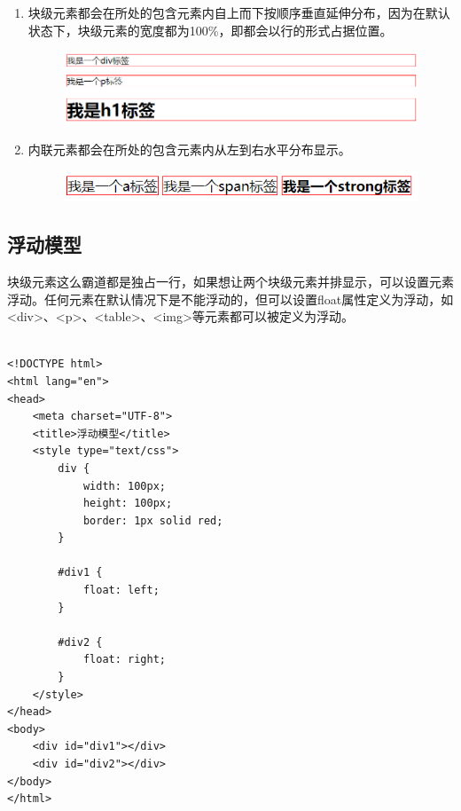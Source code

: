 \begin{enumerate}
	\item 块级元素都会在所处的包含元素内自上而下按顺序垂直延伸分布，因为在默认状态下，块级元素的宽度都为100\%，即都会以行的形式占据位置。
	      \begin{figure}[H]
		      \centering
		      \includegraphics[scale=0.7]{img/C8/8-3/1.png}
	      \end{figure}

	\item 内联元素都会在所处的包含元素内从左到右水平分布显示。
	      \begin{figure}[H]
		      \centering
		      \includegraphics[]{img/C8/8-3/2.png}
	      \end{figure}
\end{enumerate}

\subsection{浮动模型}

块级元素这么霸道都是独占一行，如果想让两个块级元素并排显示，可以设置元素浮动。任何元素在默认情况下是不能浮动的，但可以设置float属性定义为浮动，如<div>、<p>、<table>、<img>等元素都可以被定义为浮动。 \\

 \\
\begin{lstlisting}[style=htmlcssjs]
<!DOCTYPE html>
<html lang="en">
<head>
    <meta charset="UTF-8">
    <title>浮动模型</title>
    <style type="text/css">
        div {
            width: 100px;
            height: 100px;
            border: 1px solid red;
        }

        #div1 {
            float: left;
        }

        #div2 {
            float: right;
        }
    </style>
</head>
<body>
    <div id="div1"></div>
    <div id="div2"></div>
</body>
</html>
\end{lstlisting}

